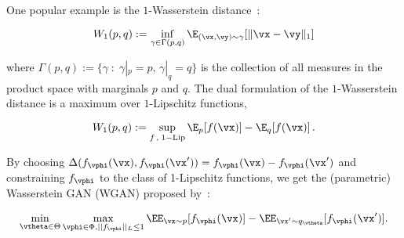 One popular example is the $1$-Wasserstein distance~\citep{villani2009wasserstein}:

\begin{equation}
W_1(p,q) := \inf_{\gamma \in \Gamma(p,q)} \E_{(\vx,\vy)\sim \gamma} [\|\vx-\vy\|_1]
\end{equation}

where $\Gamma(p,q):= \{\gamma \;:\; \gamma|_{p} = p, \, \gamma|_q = q\}$ is the collection of all measures in the product space with marginals $p$ and $q$. The dual formulation of the $1$-Wasserstein distance is a maximum over $1$-Lipschitz functions,

\begin{equation}
W_1(p,q) := \sup_{f \,, \; 1-\text{Lip}} \E_p[f(\vx)] - \E_q[f(\vx)] \,.
\end{equation}




By choosing $\Delta(f_\vphi(\vx), f_\vphi(\vx')) = f_\vphi(\vx) - f_\vphi(\vx')$ and constraining $f_\vphi$ to the class of 1-Lipschitz functions, we get the (parametric) Wasserstein GAN (WGAN) proposed by~\citet{arjovsky2017wasserstein}:

\begin{equation}
\label{eq:WGANobj}
\min_{\vtheta \in \Theta} \max_{\vphi \in \Phi, ||f_\vphi||_L \leq 1} \EE_{\vx \sim p}[f_\vphi(\vx)] - \EE_{\vx' \sim q_{\vtheta}}[f_\vphi(\vx')] . %
\end{equation}













\endinput




